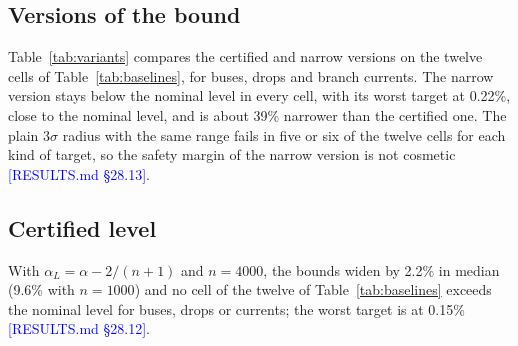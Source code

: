 \documentclass[preprint,12pt]{elsarticle}
\newcommand{\src}[1]{\textcolor{blue}{[#1]}}          %
\begin{document}
\subsection{Versions of the bound}
Table~\ref{tab:variants} compares the certified and narrow versions on the twelve cells of
Table~\ref{tab:baselines}, for buses, drops and branch currents. The narrow version stays below the nominal level in
every cell, with its worst target at 0.22\%, close to the nominal level, and is about 39\% narrower than the certified
one. The plain $3\sigma$ radius with the same range fails in five or six of the twelve cells for each kind of target,
so the safety margin of the narrow version is not cosmetic \src{RESULTS.md §28.13}.

\begin{table}[t]
\centering\small
\caption{Versions of the bound on the twelve cells of Table~\ref{tab:baselines} (four systems), against 20\,000 AC
samples per cell: worst violation over all cells and number of cells with a target above 0.27\%, median width over
the certified version, and single-process time on PEGASE-2869. Sources: results/b12\_gaussian\_variant.csv,
results/b12\_timing.csv.}
\label{tab:variants}
\resizebox{\linewidth}{!}{}
\end{table}

\subsection{Certified level}
With $\alpha_L = \alpha - 2/(n+1)$ and $n = 4000$, the bounds widen by 2.2\% in median (9.6\% with $n = 1000$) and
no cell of the twelve of Table~\ref{tab:baselines} exceeds the nominal level for buses, drops or currents; the worst
target is at 0.15\% \src{RESULTS.md §28.12}.

\end{document}
